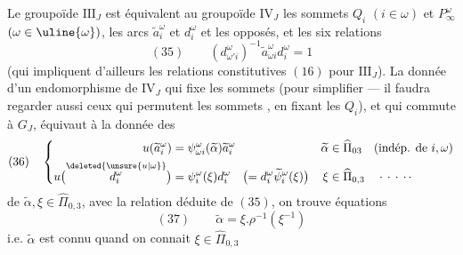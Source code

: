 Le groupoïde $\mathrm{III}_J$ est équivalent au groupoïde $\mathrm{IV}_J$   les sommets $Q_i$ $(i\in\omega)$ et $P_\infty^\omega$ $(\omega\in\uline{\omega})$, les arcs $\widetilde a_i^\omega$ et $d_i^\omega$ et les  opposés, et les six relations
\[
(35)\qquad(d_{\omega'i}^\omega)^{-1}\widetilde a_{\omega i}^{\omega}d_i^\omega=1
\]
(qui impliquent d'ailleurs les relations constitutives $(16)$ pour $\mathrm{III}_J$). La donnée d'un endomorphisme de $\mathrm{IV}_J$ qui fixe les  sommets (pour simplifier --- il faudra regarder aussi ceux qui permutent les sommets , en fixant les $Q_i$),  et qui commute à $G_J$, équivaut à la donnée des
\[
(36)\quad\left\{\begin{aligned}
u(\widetilde a_i^\omega)&=\psi_{\omega i}^\omega(\widetilde\alpha)\widetilde a_i^\omega
&\widetilde\alpha&\in\widehat\Pi_{03}\quad\text{(indép. de }i,\omega\text{)}\\
u\bigl(\overset{\deleted{\unsure{u|\omega}}}{d_i^\omega}\bigr)&=\psi_i^\omega(\xi)d_i^\omega\quad\bigl(=d_i^\omega\widetilde\psi_i^\omega(\xi)\bigr)
&\xi&\in\widehat\Pi_{0,3}\quad\cdot\,\cdot\,\cdot\,\cdot\,\cdot
\end{aligned}\right.
\]
de $\widetilde\alpha,\xi\in\widehat\Pi_{0,3}$, avec la relation déduite de $(35)$, on trouve  équations
\[
(37)\qquad\widetilde\alpha=\xi.\rho^{-1}(\xi^{-1})
\]
i.e. $\widetilde\alpha$ est connu quand on connait $\xi\in\widehat\Pi_{0,3}$
